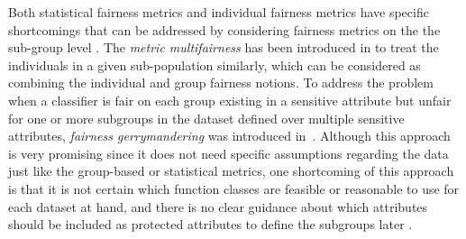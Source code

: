 
Both statistical fairness metrics and individual fairness metrics have specific shortcomings that can be addressed by considering fairness metrics on the the sub-group level \cite{mehrabi2019survey}.
The \emph{metric multifairness} has been introduced in \cite{kim2018fairness} to treat the individuals in a given sub-population similarly, which can be considered as combining the individual and group fairness notions. 
To address the problem  when a classifier is fair on each group existing in a sensitive attribute but unfair for one or more subgroups in the dataset defined over multiple sensitive attributes, \emph{fairness gerrymandering} was introduced in~\cite{kearns2018preventing}. 
Although this approach is very promising since it does not need specific assumptions regarding the data just like the group-based or statistical metrics, one shortcoming of this approach is that it is not certain which function classes are feasible or reasonable to use for each dataset at hand, and there is no clear guidance about which attributes should be included as protected attributes to define the subgroups later \cite{chouldechova2018frontiers}.



